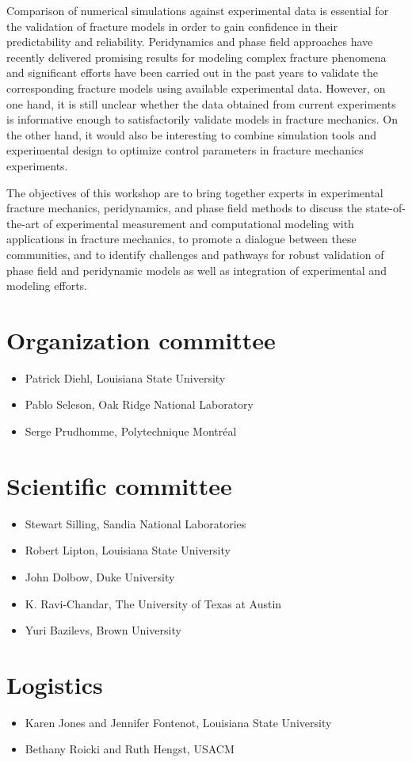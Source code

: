 Comparison of numerical simulations against experimental data is essential
for the validation of fracture models in order to gain confidence in their
predictability and reliability. Peridynamics and phase field approaches have recently
delivered promising results for modeling complex fracture phenomena and significant
efforts have been carried out in the past years to validate the corresponding
fracture models using available experimental data. However, on one hand, it is still
unclear whether the data obtained from current experiments is informative enough to
satisfactorily validate models in fracture mechanics. On the other hand, it would also be
interesting to combine simulation tools and experimental design to optimize
control parameters in fracture mechanics experiments.

The objectives of this workshop are to bring together experts in experimental fracture mechanics,
peridynamics, and phase field methods to discuss the state-of-the-art of experimental
measurement and computational modeling with applications in fracture mechanics, to promote
a dialogue between these communities, and to identify challenges and pathways for robust validation
of phase field and peridynamic models as well as integration of experimental and modeling efforts.

\section*{Organization committee}
\begin{itemize}
\item Patrick Diehl, Louisiana State University
\item Pablo Seleson, Oak Ridge National Laboratory
\item Serge Prudhomme,  Polytechnique Montréal
\end{itemize}

\section*{Scientific committee}
\begin{itemize}
\item Stewart Silling, Sandia National Laboratories
\item Robert Lipton, Louisiana State University
\item John Dolbow, Duke University
\item K. Ravi-Chandar, The University of Texas at Austin
\item Yuri Bazilevs, Brown University 
\end{itemize}

\section*{Logistics}
\begin{itemize}
\item Karen Jones and Jennifer Fontenot, Louisiana State University
\item Bethany Roicki and Ruth Hengst, USACM
\end{itemize}
